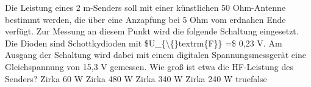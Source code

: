     {Die Leistung eines 2 m-Senders soll mit einer künstlichen 50 Ohm-Antenne bestimmt werden, die über eine Anzapfung bei 5 Ohm vom erdnahen Ende verfügt. Zur Messung an diesem Punkt wird die folgende Schaltung eingesetzt. Die Dioden sind Schottkydioden mit \$U\_\{\textbackslash\{\}textrm\{F\}\} =\$ 0,23 V. Am Ausgang der Schaltung wird dabei mit einem digitalen Spannungsmessgerät eine Gleichspannung von 15,3 V gemessen. Wie groß ist etwa die HF-Leistung des Senders?}
    {Zirka 60 W}
    {Zirka 480 W}
    {Zirka 340 W}
    {Zirka 240 W}
    {true}{false}